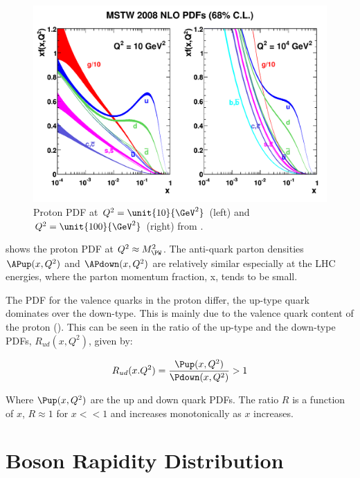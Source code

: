 \begin{figure}[htb]
  \centering
  \includegraphics[width=\textwidth]{mstw2008nlo68cl_allpdfs}
  \caption{Proton PDF at  $ Q^2 = \unit{ 10  }{\GeV^2} $ (left) 
                      and $ Q^2 = \unit{ 100  }{\GeV^2} $ (right) 
                     from \cite{Martin:2009iq}. }
  \label{wbos:pdf}
\end{figure}

 shows the proton PDF at $Q^2\approx M_{\PW}^2$.  The
anti-quark parton densities $\APup(x,Q^2)$ and $\APdown(x,Q^2)$ are relatively
similar especially at the LHC energies, where the parton momentum fraction, x,
tends to be small.

The \ac{PDF} for the valence quarks in the proton differ, the up-type quark
dominates over the down-type. This is mainly due to the valence quark content
of the proton (\HepProcess{\Pup\Pup\Pdown}).  This can be seen in the
ratio of the up-type and the down-type \acp{PDF}, $R_{ud}(x,Q^2)$, given by:

\begin{equation}
  R_{ud}(x.Q^2) = \frac{\Pup(x,Q^2)}{ \Pdown(x,Q^2)} > 1
\end{equation}

Where $\Pup(x,Q^2)$ are the up and down quark \acp{PDF}.  
The ratio $R$ is a function of $x$, $R \approx 1$ for $x<<1$ and increases
monotonically as $x$ increases.  

\section{\PW Boson Rapidity Distribution}
\label{wbos:wrapsec}

